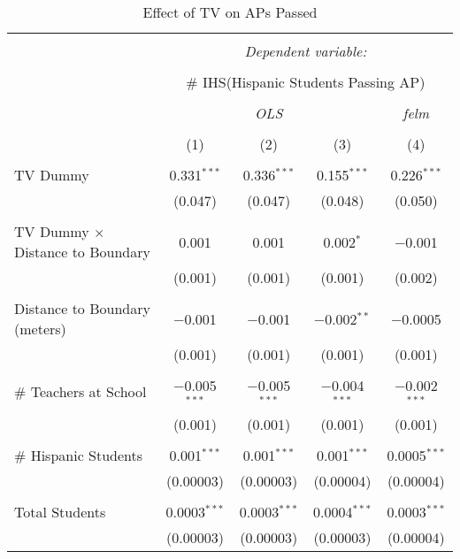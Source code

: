 
\begin{table}[!htbp] \centering 
  \caption{Effect of TV on APs Passed} 
  \label{} 
\begin{tabular}{@{\extracolsep{-2pt}}lcccc} 
\\[-1.8ex]\hline 
\hline \\[-1.8ex] 
 & \multicolumn{4}{c}{\textit{Dependent variable:}} \\ 
\cline{2-5} 
\\[-1.8ex] & \multicolumn{4}{c}{\# IHS(Hispanic Students Passing AP)} \\ 
\\[-1.8ex] & \multicolumn{3}{c}{\textit{OLS}} & \textit{felm} \\ 
\\[-1.8ex] & (1) & (2) & (3) & (4)\\ 
\hline \\[-1.8ex] 
 TV Dummy & 0.331$^{***}$ & 0.336$^{***}$ & 0.155$^{***}$ & 0.226$^{***}$ \\ 
  & (0.047) & (0.047) & (0.048) & (0.050) \\ 
  & & & & \\ 
 TV Dummy $\times$ Distance to Boundary & 0.001 & 0.001 & 0.002$^{*}$ & $-$0.001 \\ 
  & (0.001) & (0.001) & (0.001) & (0.002) \\ 
  & & & & \\ 
 Distance to Boundary (meters) & $-$0.001 & $-$0.001 & $-$0.002$^{**}$ & $-$0.0005 \\ 
  & (0.001) & (0.001) & (0.001) & (0.001) \\ 
  & & & & \\ 
 \# Teachers at School & $-$0.005$^{***}$ & $-$0.005$^{***}$ & $-$0.004$^{***}$ & $-$0.002$^{***}$ \\ 
  & (0.001) & (0.001) & (0.001) & (0.001) \\ 
  & & & & \\ 
 \# Hispanic Students & 0.001$^{***}$ & 0.001$^{***}$ & 0.001$^{***}$ & 0.0005$^{***}$ \\ 
  & (0.00003) & (0.00003) & (0.00004) & (0.00004) \\ 
  & & & & \\ 
 Total Students & 0.0003$^{***}$ & 0.0003$^{***}$ & 0.0004$^{***}$ & 0.0003$^{***}$ \\ 
  & (0.00003) & (0.00003) & (0.00003) & (0.00004) \\ 

\end{tabular}
\end{table}
